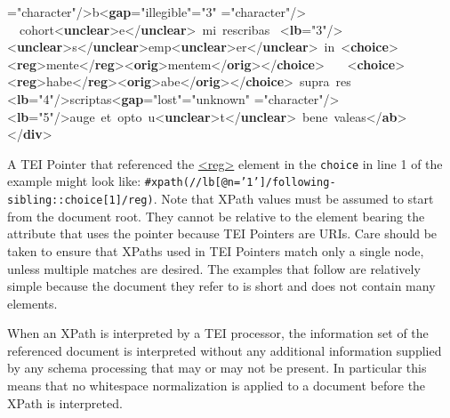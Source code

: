 \begin{shaded}
{\hspace*{1em}{unit}="{character}"/>}b{<\textbf{gap}\hspace*{1em}{reason}="{illegible}"\hspace*{1em}{quantity}="{3}"\mbox{}\newline 
\hspace*{1em}{unit}="{character}"/>} \newline
  cohort{<\textbf{unclear}>}e{</\textbf{unclear}>} mi rescribas \newline
{<\textbf{lb}\hspace*{1em}{n}="{3}"/>}{<\textbf{unclear}>}s{</\textbf{unclear}>}emp{<\textbf{unclear}>}er{</\textbf{unclear}>} in {<\textbf{choice}>}{<\textbf{reg}>}mente{</\textbf{reg}>}{<\textbf{orig}>}mentem{</\textbf{orig}>}{</\textbf{choice}>} \newline
  {<\textbf{choice}>}{<\textbf{reg}>}habe{</\textbf{reg}>}{<\textbf{orig}>}abe{</\textbf{orig}>}{</\textbf{choice}>} supra res \newline
{<\textbf{lb}\hspace*{1em}{n}="{4}"/>}scriptas{<\textbf{gap}\hspace*{1em}{reason}="{lost}"\hspace*{1em}{extent}="{unknown}"\mbox{}\newline 
\hspace*{1em}{unit}="{character}"/>} \newline
{<\textbf{lb}\hspace*{1em}{n}="{5}"/>}auge et opto u{<\textbf{unclear}>}t{</\textbf{unclear}>} bene valeas{</\textbf{ab}>}\mbox{}\newline 
{</\textbf{div}>}\end{shaded}\egroup\par \par
A TEI Pointer that referenced the \hyperref[TEI.reg]{<reg>} element in the \texttt{choice} in line 1 of the example might look like: \mbox{}\newline 
\texttt{\#xpath(//lb[@n='1']/following-sibling::choice[1]/reg)}. Note that XPath values must be assumed to start from the document root. They cannot be relative to the element bearing the attribute that uses the pointer because TEI Pointers are URIs. Care should be taken to ensure that XPaths used in TEI Pointers match only a single node, unless multiple matches are desired. The examples that follow are relatively simple because the document they refer to is short and does not contain many elements.\par
When an XPath is interpreted by a TEI processor, the information set of the referenced document is interpreted without any additional information supplied by any schema processing that may or may not be present. In particular this means that no whitespace normalization is applied to a document before the XPath is interpreted. \par
